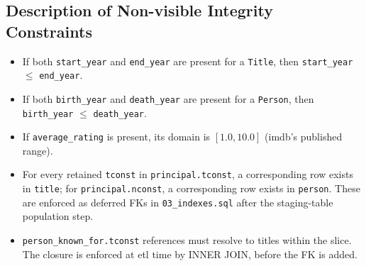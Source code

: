 \subsection{Description of Non-visible Integrity Constraints}
\label{sec:non-visible-constraints}
\begin{itemize}
    \item If both \texttt{start\_year} and \texttt{end\_year} are present for a \texttt{Title}, then \texttt{start\_year} $\leq$ \texttt{end\_year}.
    \item If both \texttt{birth\_year} and \texttt{death\_year} are present for a \texttt{Person}, then \texttt{birth\_year} $\leq$ \texttt{death\_year}.
    \item If \texttt{average\_rating} is present, its domain is $[1.0, 10.0]$ (\ac{imdb}'s published range).
    \item For every retained \texttt{tconst} in \texttt{principal.tconst}, a corresponding row exists in \texttt{title}; for \texttt{principal.nconst}, a corresponding row exists in \texttt{person}. These are enforced as deferred FKs in \texttt{03\_indexes.sql} after the staging-table population step.
    \item \texttt{person\_known\_for.tconst} references must resolve to titles within the slice. The closure is enforced at \ac{etl} time by INNER JOIN, before the FK is added.
\end{itemize}
